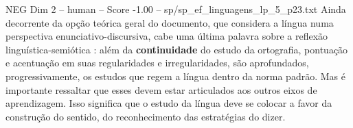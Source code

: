 \begin{textsample}{NEG Dim 2 – human – Score -1.00 – sp/sp\_ef\_linguagens\_lp\_5\_p23.txt}  \label{ex:f2_neg_018}
Ainda decorrente da opção teórica geral do documento, que considera a língua numa perspectiva enunciativo-discursiva, cabe uma última palavra sobre a reflexão linguística-semiótica : além da \textbf{continuidade} do estudo da ortografia, pontuação e acentuação em suas regularidades e irregularidades, são aprofundados, progressivamente, os estudos que regem a língua dentro da norma padrão.
Mas é importante ressaltar que esses devem estar articulados aos outros eixos de aprendizagem.
Isso significa que o estudo da língua deve se colocar a favor da construção do sentido, do reconhecimento das estratégias do dizer.

\end{textsample}
